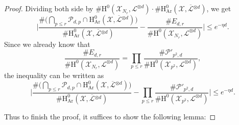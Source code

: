 \documentclass[11pt]{article}
\numberwithin{equation}{section}
\theoremstyle{plain}
\theoremstyle{definition}
\newcommand{\ho}{\mathrm{H}}
\newcommand{\X}{\mathcal{X}}
\newcommand{\Li}{\overline{\mathcal{L}}{}}
\newcommand{\li}{\mathcal{L}}
\begin{document}
\begin{proof}
Dividing both side by $\#\ho^0(\X_{N_r}, \li^{\otimes d})\cdot\#\ho^0_{\mathrm{Ar}}(\X, \Li^{\otimes d})$, we get
\[
\biggl| \frac{\#\bigl(\bigcap_{p\leq r}\mathcal{P}_{d,p}\cap \ho^0_{\mathrm{Ar}}(\X, \Li^{\otimes d})\bigr)}{\#\ho^0_{\mathrm{Ar}}(\X, \Li^{\otimes d})} -\frac{\#E_{d,r}}{\#\ho^0(\X_{N_r}, \li^{\otimes d})} \biggr|\leq e^{-\eta d}.
\]
Since we already know that
\[
\frac{\#E_{d,r}}{\#\ho^0(\X_{N_r}, \li^{\otimes d})}=\prod_{p\leq r} \frac{\#\mathcal{P}'_{p^2,d}}{\#\ho^0(\X_{p^2}, \li^{\otimes d})},
\]
the inequality can be written as
\[
\biggl| \frac{\#\bigl(\bigcap_{p\leq r}\mathcal{P}_{d,p}\cap \ho^0_{\mathrm{Ar}}(\X, \Li^{\otimes d})\bigr)}{\#\ho^0_{\mathrm{Ar}}(\X, \Li^{\otimes d})} -\prod_{p\leq r} \frac{\#\mathcal{P}'_{p^2,d}}{\#\ho^0(\X_{p^2}, \li^{\otimes d})} \biggr|\leq e^{-\eta d}.
\]

Thus to finish the proof, it suffices to show the following lemma:


\end{proof}
\end{document}
